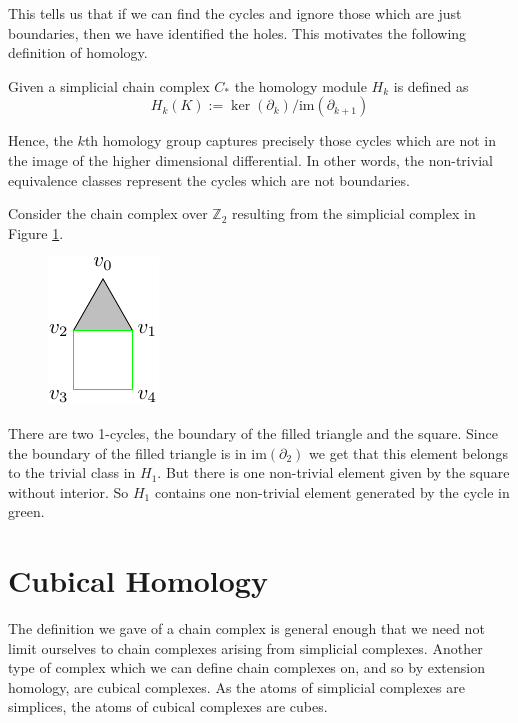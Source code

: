 This tells us that if we can find the cycles and ignore those which are just boundaries, then we have identified the holes. This motivates the following definition of homology.
\begin{definition}
  Given a simplicial chain complex \hspace{0.05cm}$C_{*}$ the homology module $H_{k}$ is defined as
  \[H_{k}(K) := \ker(\partial_{k})/\text{im}(\partial_{k+1})\]
\end{definition}
Hence, the $k$th homology group captures precisely those cycles which are not in the image of the higher dimensional differential. In other words, the non-trivial equivalence classes represent the cycles which are not boundaries.
\begin{example}
Consider the chain complex over $\mathbb{Z}_{2}$ resulting from the simplicial complex in Figure \ref{trihom}.
\begin{figure}[ht]
  \centering
  \includegraphics[scale=2]{trisquarefilled.pdf}
  \caption{\label{trihom} }
\end{figure}
There are two 1-cycles, the boundary of the filled triangle and the square. Since the boundary of the filled triangle is in $\text{im} (\partial_{2})$ we get that this element belongs to the trivial class in $H_{1}$. But there is one non-trivial element given by the square without interior. So $H_{1}$ contains one non-trivial element generated by the cycle in green.


\section{Cubical Homology}
The definition we gave of a chain complex is general enough that we need not limit ourselves to chain complexes arising from simplicial complexes. Another type of complex which we can define chain complexes on, and so by extension homology, are cubical complexes. As the atoms of simplicial complexes are simplices, the atoms of cubical complexes are cubes.


\end{example}
